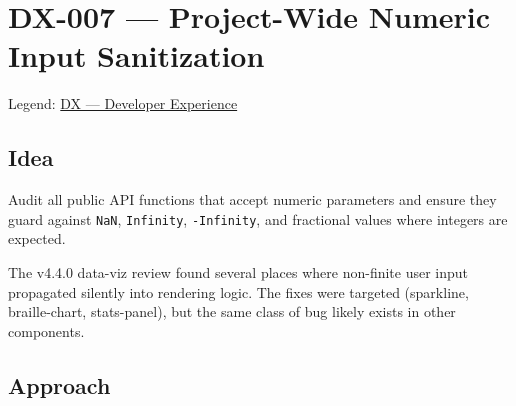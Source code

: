 \chapter{DX-007 --- Project-Wide Numeric Input Sanitization}\label{record-308}

\smallskip

Legend: \href{https://github.com/flyingrobots/bijou/blob/cbd70612140e7a450d764b3c7be1c6af878b99bc/docs/method/graveyard/legends/DX-developer-experience.md}{DX --- Developer Experience}

\section{Idea}\label{record-308-idea}

Audit all public API functions that accept numeric parameters and ensure they guard against \texttt{N\allowbreak{}a\allowbreak{}N}, \texttt{I\allowbreak{}n\allowbreak{}f\allowbreak{}i\allowbreak{}n\allowbreak{}i\allowbreak{}t\allowbreak{}y}, \texttt{-\allowbreak{}I\allowbreak{}n\allowbreak{}f\allowbreak{}i\allowbreak{}n\allowbreak{}i\allowbreak{}t\allowbreak{}y}, and fractional values where integers are expected.

The v4.4.0 data-viz review found several places where non-finite user input propagated silently into rendering logic. The fixes were targeted (sparkline, braille-chart, stats-panel), but the same class of bug likely exists in other components.

\section{Approach}\label{record-308-approach}

